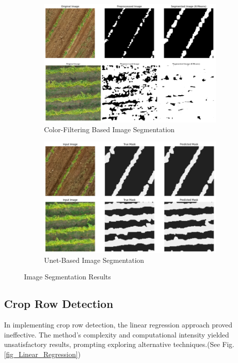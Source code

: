 \documentclass[conference]{IEEEtran}
\begin{document}
	\begin{figure}[t]
		\begin{subfigure}{\linewidth}
			\centering
			\includegraphics[width=0.7\linewidth]{kmeans_predictions.png}
			\caption{Color-Filtering Based Image Segmentation}
			\label{fig2:kmeans}
		\end{subfigure}
		
		\vspace{0.5cm}
		
		\begin{subfigure}{\linewidth}
			\centering
			\includegraphics[width=0.7\linewidth]{unet_predictions.png}
			\caption{Unet-Based Image Segmentation}
			\label{fig2:Unet_Segmentation}
		\end{subfigure}
		
		\caption{Image Segmentation Results \cite{b5}}
		\label{fig:Image_Segmentation_Results}
	\end{figure}
	
	\subsection{Crop Row Detection}
	
	In implementing crop row detection, the linear regression approach proved ineffective. The method's complexity and computational intensity yielded unsatisfactory results, prompting exploring alternative techniques.(See Fig.\ref{fig_Linear_Regression})
	
\end{document}
